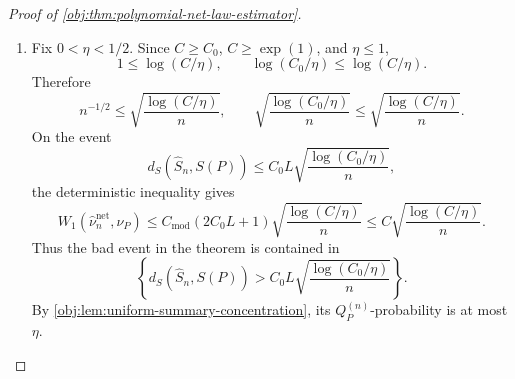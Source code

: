 \documentclass[11pt]{article}
\begin{document}
\begin{proof}[Proof of \cref{obj:thm:polynomial-net-law-estimator}]
\begin{enumerate}
\item Fix \(0<\eta<1/2\).  Since \(C\ge C_0\), \(C\ge\exp(1)\), and
\(\eta\le1\),
\[
1\le \log(C/\eta),
\qquad
\log(C_0/\eta)\le \log(C/\eta).
\]
Therefore
\[
n^{-1/2}\le
\sqrt{\frac{\log(C/\eta)}{n}},
\qquad
\sqrt{\frac{\log(C_0/\eta)}{n}}
\le
\sqrt{\frac{\log(C/\eta)}{n}}.
\]
On the event
\[
d_S(\widehat S_n,S(P))
\le
C_0L\sqrt{\frac{\log(C_0/\eta)}{n}},
\]
the deterministic inequality gives
\[
W_1(\widehat\nu_n^{\mathrm{net}},\nu_P)
\le
C_{\mathrm{mod}}(2C_0L+1)
\sqrt{\frac{\log(C/\eta)}{n}}
\le
C\sqrt{\frac{\log(C/\eta)}{n}}.
\]
Thus the bad event in the theorem is contained in
\[
\left\{
d_S(\widehat S_n,S(P))
>
C_0L\sqrt{\frac{\log(C_0/\eta)}{n}}
\right\}.
\]
By \cref{obj:lem:uniform-summary-concentration}, its \(Q_P^{(n)}\)-probability
is at most \(\eta\). %
\end{enumerate}
\end{proof}




\end{document}

